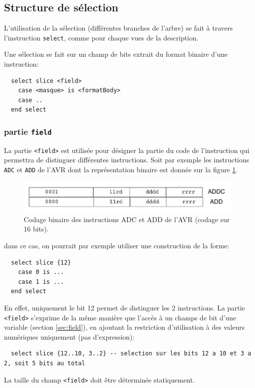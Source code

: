 \subsection{Structure de sélection}
\label{sec:formatSelect}
L'utilisation de la sélection (différentes branches de l'arbre) se fait à travers l'instruction \texttt{select}, comme pour chaque vues de la description. 

Une sélection se fait sur un champ de bits extrait du format binaire d'une instruction:
\begin{lstlisting}
  select slice <field>
    case <masque> is <formatBody>
    case .. 
  end select
\end{lstlisting}

\subsubsection{partie \texttt{field}}
La partie \texttt{<field>} est utilisée pour désigner la partie du code de l'instruction qui permettra de distinguer différentes instructions. Soit par exemple les instructions \texttt{ADC} et \texttt{ADD} de l'AVR dont la représentation binaire est donnée sur la figure \ref{fig:selectFormat1}.

\begin{figure}[h]		%
  \begin{center}
    \includegraphics[width=0.8 \linewidth]{../common/images/selectFormat1.pdf}
    \caption{Codage binaire des instructions ADC et ADD de l'AVR (codage sur 16 bits).}
    \label{fig:selectFormat1}
  \end{center}
\end{figure}

dans ce cas, on pourrait par exemple utiliser une construction de la forme:
\begin{lstlisting}
  select slice {12}
    case 0 is ...
    case 1 is ...
  end select
\end{lstlisting}
En effet, uniquement le bit 12 permet de distinguer les 2 instructions. La partie \texttt{<field>} s'exprime de la même manière que l'accès à un champs de bit d'une variable (section \ref{sec:field}), en ajoutant la restriction d'utilisation à des valeurs numériques uniquement (pas d'expression):
\begin{lstlisting}
  select slice {12..10, 3..2} -- selection sur les bits 12 a 10 et 3 a 2, soit 5 bits au total
\end{lstlisting}
La taille du champ \texttt{<field>} doit être déterminée statiquement.

